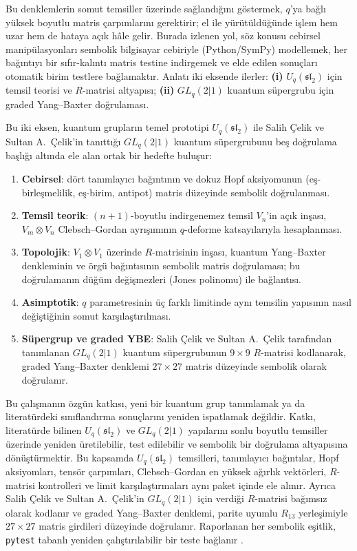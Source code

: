 \documentclass[10pt]{math}
\numberwithin{equation}{section}
\theoremstyle{plain}
\theoremstyle{definition}
\renewcommand{\sl}{\mathfrak{sl}}
\newcommand{\Uq}{U_q(\sl_2)}
\begin{document}
Bu denklemlerin somut temsiller üzerinde sağlandığını göstermek, $q$'ya bağlı
yüksek boyutlu matris çarpımlarını gerektirir; el ile yürütüldüğünde işlem hem
uzar hem de hataya açık hâle gelir. Burada izlenen yol, söz konusu cebirsel
manipülasyonları sembolik bilgisayar cebiriyle (Python/SymPy) modellemek, her
bağıntıyı bir sıfır-kalıntı matris testine indirgemek ve elde edilen sonuçları
otomatik birim testlere bağlamaktır. Anlatı iki eksende ilerler: \textbf{(i)}
$\Uq$ için temsil teorisi ve $R$-matrisi altyapısı; \textbf{(ii)} $GL_q(2|1)$
kuantum süpergrubu için graded Yang--Baxter doğrulaması.

Bu iki eksen, kuantum grupların temel prototipi $\Uq$ ile Salih Çelik ve
Sultan A.\ Çelik'in tanıttığı $GL_q(2|1)$ kuantum süpergrubunu beş doğrulama
başlığı altında ele alan ortak bir hedefte buluşur:
\begin{enumerate}[leftmargin=*]
  \item \textbf{Cebirsel}: dört tanımlayıcı bağıntının ve dokuz Hopf
        aksiyomunun (eş-birleşmelilik, eş-birim, antipot) matris düzeyinde
        sembolik doğrulanması.
  \item \textbf{Temsil teorik}: $(n+1)$-boyutlu indirgenemez temsil $V_n$'in
        açık inşası, $V_m \otimes V_n$ Clebsch--Gordan ayrışımının $q$-deforme
        katsayılarıyla hesaplanması.
  \item \textbf{Topolojik}: $V_1\otimes V_1$ üzerinde $R$-matrisinin
        inşası, kuantum Yang--Baxter denkleminin ve örgü bağıntısının
        sembolik matris doğrulaması; bu doğrulamanın düğüm değişmezleri (Jones
        polinomu) ile bağlantısı.
  \item \textbf{Asimptotik}: $q$ parametresinin üç farklı limitinde aynı
        temsilin yapısının nasıl değiştiğinin somut karşılaştırılması.
  \item \textbf{Süpergrup ve graded YBE}: Salih Çelik ve Sultan A.\ Çelik tarafından tanımlanan
        $GL_q(2|1)$ kuantum süpergrubunun $9\times 9$ $R$-matrisi kodlanarak,
        graded Yang--Baxter denklemi $27\times 27$ matris düzeyinde sembolik
        olarak doğrulanır.
\end{enumerate}

Bu çalışmanın özgün katkısı, yeni bir kuantum grup tanımlamak ya da
literatürdeki sınıflandırma sonuçlarını yeniden ispatlamak değildir. Katkı,
literatürde bilinen $\Uq$ ve $GL_q(2|1)$ yapılarını sonlu boyutlu temsiller
üzerinde yeniden üretilebilir, test edilebilir ve sembolik bir doğrulama
altyapısına dönüştürmektir. Bu kapsamda $\Uq$ temsilleri, tanımlayıcı
bağıntılar, Hopf aksiyomları, tensör çarpımları, Clebsch--Gordan en yüksek
ağırlık vektörleri, $R$-matrisi kontrolleri ve limit karşılaştırmaları aynı
paket içinde ele alınır. Ayrıca Salih Çelik ve Sultan A.\ Çelik'in
$GL_q(2|1)$ için verdiği $R$-matrisi bağımsız olarak kodlanır ve graded
Yang--Baxter denklemi, parite uyumlu $R_{13}$ yerleşimiyle $27\times 27$
matris girdileri düzeyinde doğrulanır. Raporlanan her sembolik eşitlik,
\texttt{pytest} tabanlı yeniden çalıştırılabilir bir teste bağlanır
\cite{SymPy,pytest}.
\end{document}
